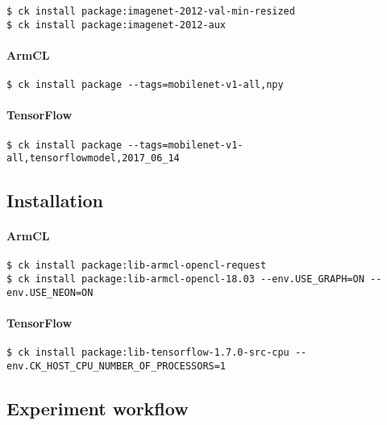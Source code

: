 \begin{verbatim}
$ ck install package:imagenet-2012-val-min-resized
$ ck install package:imagenet-2012-aux
\end{verbatim}

\paragraph{ArmCL}

\begin{verbatim}
$ ck install package --tags=mobilenet-v1-all,npy
\end{verbatim}

\paragraph{TensorFlow}

\begin{verbatim}
$ ck install package --tags=mobilenet-v1-all,tensorflowmodel,2017_06_14 
\end{verbatim}


\subsection{Installation}

\paragraph{ArmCL}

\begin{verbatim}
$ ck install package:lib-armcl-opencl-request
$ ck install package:lib-armcl-opencl-18.03 --env.USE_GRAPH=ON --env.USE_NEON=ON
\end{verbatim}

\paragraph{TensorFlow}

\begin{verbatim}
$ ck install package:lib-tensorflow-1.7.0-src-cpu --env.CK_HOST_CPU_NUMBER_OF_PROCESSORS=1
\end{verbatim}


\subsection{Experiment workflow}


